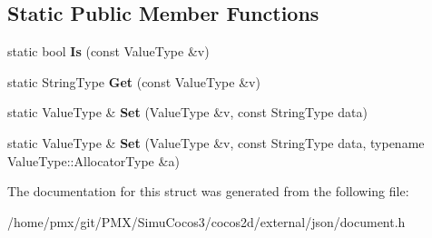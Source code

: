 \subsection*{Static Public Member Functions}
\begin{DoxyCompactItemize}
\item 
\mbox{\label{structinternal_1_1TypeHelper_3_01ValueType_00_01const_01typename_01ValueType_1_1Ch_01_5_01_4_a9543f180b6ac2b923486f1b69d5356ea}} 
static bool {\bfseries Is} (const Value\+Type \&v)
\item 
\mbox{\label{structinternal_1_1TypeHelper_3_01ValueType_00_01const_01typename_01ValueType_1_1Ch_01_5_01_4_a11f8ddfbc91f1d890d63cc67e3f1abb6}} 
static String\+Type {\bfseries Get} (const Value\+Type \&v)
\item 
\mbox{\label{structinternal_1_1TypeHelper_3_01ValueType_00_01const_01typename_01ValueType_1_1Ch_01_5_01_4_af3a44a3b6f485a71a73af69d30668c8f}} 
static Value\+Type \& {\bfseries Set} (Value\+Type \&v, const String\+Type data)
\item 
\mbox{\label{structinternal_1_1TypeHelper_3_01ValueType_00_01const_01typename_01ValueType_1_1Ch_01_5_01_4_a8588f2ab1d0ffbb4c1810d60a500a8c5}} 
static Value\+Type \& {\bfseries Set} (Value\+Type \&v, const String\+Type data, typename Value\+Type\+::\+Allocator\+Type \&a)
\end{DoxyCompactItemize}


The documentation for this struct was generated from the following file\+:\begin{DoxyCompactItemize}
\item 
/home/pmx/git/\+P\+M\+X/\+Simu\+Cocos3/cocos2d/external/json/document.\+h\end{DoxyCompactItemize}
